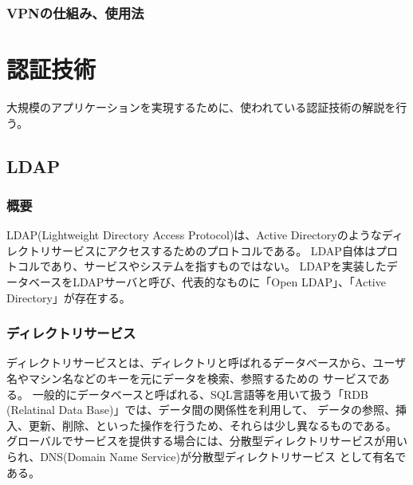 \documentclass[12pt,a4paper,titlepage]{jsarticle}
\begin{document}

\subsubsection{VPNの仕組み、使用法}


\section{認証技術}
大規模のアプリケーションを実現するために、使われている認証技術の解説を行う。
\subsection{LDAP}
\subsubsection*{概要}
LDAP(Lightweight Directory Access Protocol)は、Active Directoryのようなディレクトリサービスにアクセスするためのプロトコルである。
LDAP自体はプロトコルであり、サービスやシステムを指すものではない。
LDAPを実装したデータベースをLDAPサーバと呼び、代表的なものに「Open LDAP」、「Active Directory」が存在する。\par
\subsubsection*{ディレクトリサービス}
ディレクトリサービスとは、ディレクトリと呼ばれるデータベースから、ユーザ名やマシン名などのキーを元にデータを検索、参照するための
サービスである。
一般的にデータベースと呼ばれる、SQL言語等を用いて扱う「RDB (Relatinal Data Base)」では、データ間の関係性を利用して、
データの参照、挿入、更新、削除、といった操作を行うため、それらは少し異なるものである。
グローバルでサービスを提供する場合には、分散型ディレクトリサービスが用いられ、DNS(Domain Name Service)が分散型ディレクトリサービス
として有名である。
\end{document}
